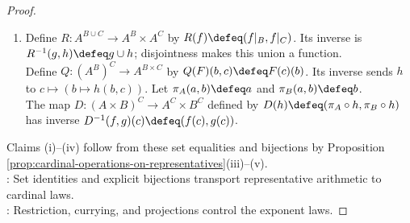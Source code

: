 \begin{proposition}
\begin{proof}
\begin{enumerate}[label=(\roman*)]
\item Define $R:A^{B\cup C}\to A^B\times A^C$ by $R(f)\defeq(f|_B,f|_C)$. Its inverse is $R^{-1}(g,h)\defeq g\cup h$; disjointness makes this union a function.\\
Define $Q:(A^B)^C\to A^{B\times C}$ by $Q(F)(b,c)\defeq F(c)(b)$. Its inverse sends $h$ to $c\mapsto(b\mapsto h(b,c))$. Let $\pi_A(a,b)\defeq a$ and $\pi_B(a,b)\defeq b$.\\
The map $D:(A\times B)^C\to A^C\times B^C$ defined by $D(h)\defeq(\pi_A\circ h,\pi_B\circ h)$ has inverse $D^{-1}(f,g)(c)\defeq(f(c),g(c))$.
\end{enumerate}
Claims (i)--(iv) follow from these set equalities and bijections by Proposition \ref{prop:cardinal-operations-on-representatives}(iii)--(v).\\
: Set identities and explicit bijections transport representative arithmetic to cardinal laws.\\
: Restriction, currying, and projections control the exponent laws.
\end{proof}
\end{proposition}

